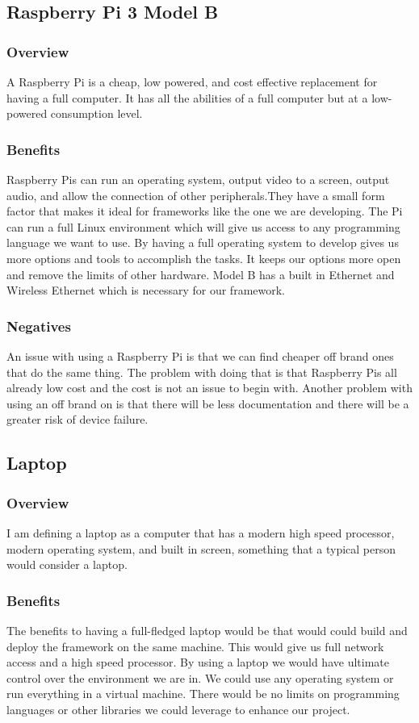 \documentclass[draftclsnofoot, onecolumn, compsoc, 10pt]{IEEEtran}
\begin{document}
\subsection{Raspberry Pi 3 Model B}
\subsubsection{Overview}
A Raspberry Pi is a cheap, low powered, and cost effective replacement for having a full computer. It has all the abilities of a full computer but at a low-powered consumption level. \cite{rpi}
\subsubsection{Benefits}
Raspberry Pis can run an operating system, output video to a screen, output audio, and allow the connection of other peripherals.They have a small form factor that makes it ideal for frameworks like the one we are developing. The Pi can run a full Linux environment which will give us access to any programming language we want to use. By having a full operating system to develop gives us more options and tools to accomplish the tasks. It keeps our options more open and remove the limits of other hardware. Model B has a built in Ethernet and Wireless Ethernet which is necessary for our framework. \cite{rpi}
\subsubsection{Negatives}
An issue with using a Raspberry Pi is that we can find cheaper off brand ones that do the same thing. The problem with doing that is that Raspberry Pis all already low cost and the cost is not an issue to begin with. Another problem with using an off brand on is that there will be less documentation and there will be a greater risk of device failure.
\subsection{Laptop}
\subsubsection{Overview}
I am defining a laptop as a computer that has a modern high speed processor, modern operating system, and built in screen, something that a typical person would consider a laptop.

\subsubsection{Benefits}
The benefits to having a full-fledged laptop would be that would could build and deploy the framework on the same machine. This would give us full network access and a high speed processor. By using a laptop we would have ultimate control over the environment we are in. We could use any operating system or run everything in a virtual machine. There would be no limits on programming languages or other libraries we could leverage to enhance our project. 
\end{document}
